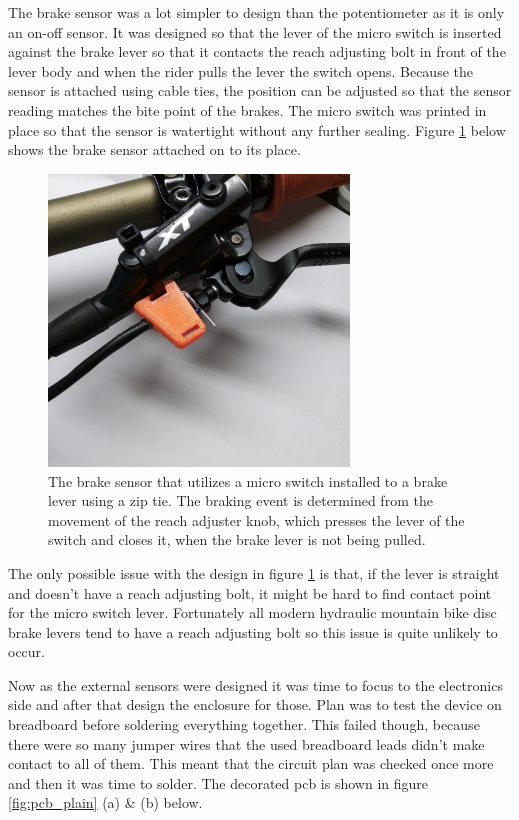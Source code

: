 \documentclass[a4paper,11pt]{article} %
\begin{document}
The brake sensor was a lot simpler to design than the potentiometer as it is only an on-off sensor. It was designed so that the lever of the micro switch is inserted against the brake lever so that it contacts the reach adjusting bolt in front of the lever body and when the rider pulls the lever the switch opens. Because the sensor is attached using cable ties, the position can be adjusted so that the sensor reading matches the bite point of the brakes. The micro switch was printed in place so that the sensor is watertight without any further sealing. Figure \ref{fig:brake_sensor} below shows the brake sensor attached on to its place.

\begin{figure}[H]
    \centering
    \includegraphics[width=80mm]{Figures/brake_sensor_1.jpg}
    \caption{The brake sensor that utilizes a micro switch installed to a brake lever using a zip tie. The braking event is determined from the movement of the reach adjuster knob, which presses the lever of the switch and closes it, when the brake lever is not being pulled.}
    \label{fig:brake_sensor}
\end{figure}

The only possible issue with the design in figure \ref{fig:brake_sensor} is that, if the lever is straight and doesn't have a reach adjusting bolt, it might be hard to find contact point for the micro switch lever. Fortunately all modern hydraulic mountain bike disc brake levers tend to have a reach adjusting bolt so this issue is quite unlikely to occur.

Now as the external sensors were designed it was time to focus to the electronics side and after that design the enclosure for those. Plan was to test the device on breadboard before soldering everything together. This failed though, because there were so many jumper wires that the used breadboard leads didn't make contact to all of them. This meant that the circuit plan was checked once more and then it was time to solder. The decorated pcb is shown in figure \ref{fig:pcb_plain} (a) \& (b) below.
\end{document}
